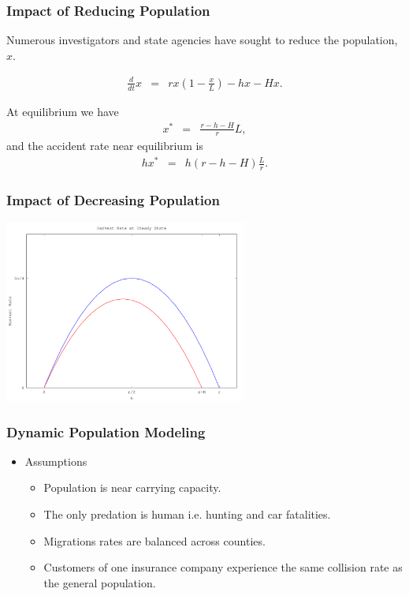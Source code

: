 \documentclass{beamer}   %
\newcommand{\lp}{\left(}
\newcommand{\rp}{\right)}
\begin{document}
\begin{frame}
  \frametitle{Impact of Reducing Population}

  Numerous investigators and state agencies have sought to reduce the
  population, $x$. 

  \vfill

  \begin{eqnarray*}
    \frac{d}{dt} x & = & r x \lp 1 - \frac{x}{L} \rp - h x - Hx.
  \end{eqnarray*}

  \vfill

  At equilibrium we have
  \begin{eqnarray*}
    x^* & = & \frac{r-h-H}{r} L,
  \end{eqnarray*}
  and the accident rate near equilibrium is
  \begin{eqnarray*}
    h x^* & = & h(r-h-H)\frac{L}{r}.
  \end{eqnarray*}


\end{frame}


\begin{frame}
  \frametitle{Impact of Decreasing Population}
  \centerline{\includegraphics[height=6cm]{reducedPopulation}}
\end{frame}


\begin{frame}
  \frametitle{Dynamic Population Modeling}
  \begin{itemize}
  \item Assumptions
    \begin{itemize}
    \item Population is near carrying capacity.
    \item The only predation is human i.e. hunting and car fatalities.
    \item Migrations rates are balanced across counties.
    \item Customers of one insurance company experience
      the same collision rate as the general population.
    \end{itemize}
  \end{itemize}
\end{frame}
\end{document}
